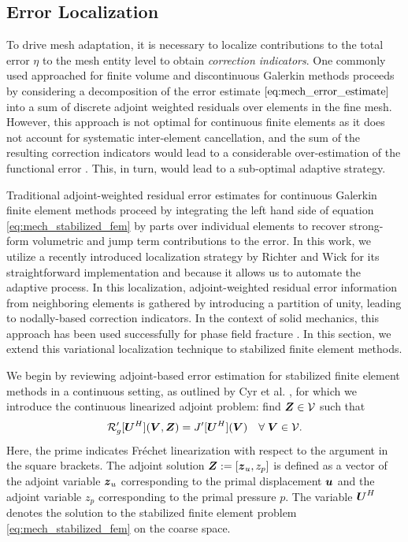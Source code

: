 \subsection{Error Localization}

To drive mesh adaptation, it is necessary to localize contributions to the
total error $\eta$ to the mesh entity level to obtain
\emph{correction indicators}. One commonly used approached for finite volume
and discontinuous Galerkin methods proceeds by considering a decomposition
of the error estimate $\eqref{eq:mech_error_estimate}$ into a sum of discrete
adjoint weighted residuals over elements in the fine mesh. However, this
approach is not optimal for continuous finite elements as it does not account
for systematic inter-element cancellation, and the sum of the resulting
correction indicators would lead to a considerable over-estimation of
the functional error \cite{fidkowski2011review}. This, in turn, would lead to
a sub-optimal adaptive strategy.

Traditional adjoint-weighted residual error estimates for continuous Galerkin
finite element methods proceed by integrating the left hand side of equation
\eqref{eq:mech_stabilized_fem} by parts over individual elements to recover
strong-form volumetric and jump term contributions to the error. In this
work, we utilize a recently introduced localization strategy by Richter and
Wick \cite{richter2015variational} for its straightforward implementation
and because it allows us to automate the adaptive process. In this
localization,
adjoint-weighted residual error information from
neighboring elements is gathered by introducing a partition of unity,
leading to nodally-based correction indicators. In the context of solid
mechanics, this approach has been used successfully for phase field fracture
\cite{wick2016goal}. In this section, we extend this variational localization
technique to stabilized finite element methods.

We begin by reviewing adjoint-based error estimation for stabilized finite
element methods in a continuous setting, as outlined by Cyr et al.
\cite{cyr2014approaches}, for which we introduce the continuous linearized
adjoint problem: find $\boldsymbol{Z} \in \mathcal{V}$ such that
%
\begin{gather}
\mathcal{R}'_g[\boldsymbol{U}^H](\boldsymbol{V}, \boldsymbol{Z}) = J'[\boldsymbol{U}^H](\boldsymbol{V})
\quad \forall \; \boldsymbol{V} \in \mathcal{V}.
\label{eq:mech_continuous_adjoint}
\end{gather}
%
Here, the prime indicates Fr\'{e}chet linearization with respect to the
argument in the square brackets. The adjoint solution $\boldsymbol{Z} :=
[\boldsymbol{z}_u, z_p]$ is defined as a vector of the adjoint variable $\boldsymbol{z}_u$
corresponding to the primal displacement $\boldsymbol{u}$ and the adjoint variable
$z_p$ corresponding to the primal pressure $p$. The variable $\boldsymbol{U}^H$
denotes the solution to the stabilized finite element problem
\eqref{eq:mech_stabilized_fem} on the coarse space.

